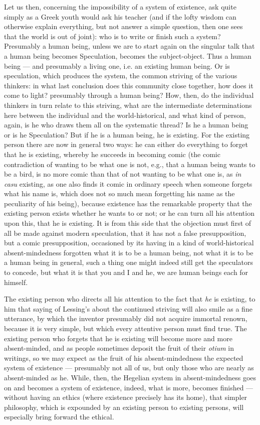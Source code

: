 \documentclass[12pt,a4paper,openany]{book}
\newcommand{\opage}[1]{\marginnote{\footnotesize\textit{[#1]}}}
\begin{document}
Let us then, concerning the impossibility of a system of existence, ask quite simply
as a Greek youth would ask his teacher (and if the lofty wisdom can otherwise explain
everything, but not answer a simple question, then one sees that the world is out of
joint): who is to write or finish such a system? Presumably a human being, unless we
are to start again on the singular talk that a human being becomes Speculation,
becomes the subject-object. Thus a human being --- and presumably a living one, i.e.
an existing human being. Or is speculation, which produces the system, the common
striving of the various thinkers: in what last conclusion does this community close
together, how does it come to light? presumably through a human being? How, then,
do the individual thinkers in turn relate to this striving, what are the intermediate
determinations here between the individual and the world-historical, and what kind of
person, again, is he who draws them all on the systematic thread? Is he a human being
or is he Speculation? But if he is a human being, he is existing. For the existing
person there are now in general two ways: he can either do everything to forget that
he is existing, whereby he succeeds in becoming comic (the comic contradiction of
wanting to be what one is not, e.g., that a human being wants to be a bird, is no more
comic than that of not wanting to be what one is, as \textit{in casu} existing, as one
also finds it comic in ordinary speech when someone forgets what his name is, which
does not so much mean forgetting his name as the peculiarity of his being), because
existence has the remarkable property that the existing person exists whether he
wants to or not; or he can
\setcounter{footnote}{0}%
\opage{182}turn all his attention upon this, that he is existing. It is from this side that
the objection must first of all be made against modern speculation, that it has not a
false presupposition, but a comic presupposition, occasioned by its having in a kind
of world-historical absent-mindedness forgotten what it is to be a human being, not
what it is to be a human being in general, such a thing one might indeed still get the
speculators to concede, but what it is that you and I and he, we are human beings each
for himself.

The existing person who directs all his attention to the fact that \emph{he} is
existing, to him that saying of Lessing's about the continued striving will also smile
as a fine utterance, by which the inventor presumably did not acquire immortal
renown, because it is very simple, but which every attentive person must find true.
The existing person who forgets that he is existing will become more and more
absent-minded, and as people sometimes deposit the fruit of their \textit{otium} in
writings, so we may expect as the fruit of his absent-mindedness the expected system
of existence --- presumably not all of us, but only those who are nearly as
absent-minded as he. While, then, the Hegelian system in absent-mindedness goes on and
becomes a system of existence, indeed, what is more, becomes finished --- without
having an ethics (where existence precisely has its home), that simpler philosophy,
which is expounded by an existing person to existing persons, will especially bring
forward the ethical.
\end{document}
